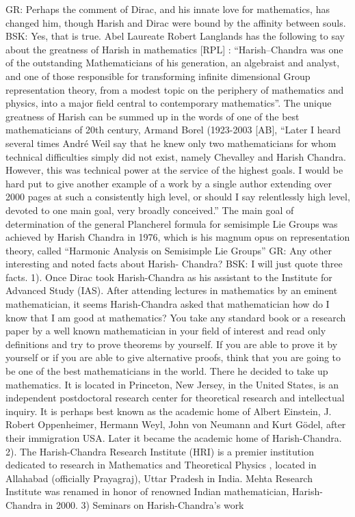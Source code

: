   GR: Perhaps the comment of Dirac, and his innate love for mathematics, has changed him, though Harish and Dirac were bound by the affinity between souls.                                                           BSK: Yes, that is true.  Abel Laureate Robert Langlands has the following to say about the greatness of Harish in mathematics [RPL] : “Harish–Chandra was one of the outstanding Mathematicians of his generation, an algebraist and analyst, and one of those responsible for transforming infinite dimensional Group representation theory, from a modest topic on the periphery of mathematics and physics, into a major field central to contemporary mathematics”. The unique greatness of Harish can be summed up in the words of one of the best mathematicians of 20th century, Armand Borel (1923-2003 [AB], “Later I heard several times André Weil say that he knew only two mathematicians for whom technical difficulties simply did not exist, namely Chevalley and Harish Chandra.  However, this was technical power at the service of the highest goals. I would be hard put to give another example of a work by a single author extending over 2000 pages at such a consistently high level, or should I say relentlessly high level, devoted to one main goal, very broadly conceived.”  The main goal of determination of the general Plancherel formula for semisimple Lie Groups was achieved by Harish Chandra in 1976, which is his magnum opus on representation theory, called “Harmonic Analysis on Semisimple Lie Groups”
GR: Any other interesting and noted facts about Harish- Chandra?
BSK:  I will just quote three facts.
     1). Once Dirac took Harish-Chandra as his assistant to  the Institute for Advanced Study (IAS). After attending  lectures in mathematics by an eminent mathematician,  it seems Harish-Chandra asked that mathematician how do I know that I am good at mathematics? You take any standard book or a research paper by a well known mathematician in your field of interest and read only definitions and try to prove theorems by yourself. If you are able to prove it by yourself or if you are able to give alternative proofs, think that you are going to be one of the best mathematicians in the world. There he decided to take up mathematics.
     It is located in Princeton, New Jersey, in the United States, is an independent postdoctoral research center for theoretical research and intellectual inquiry. It is perhaps best known as the academic home of Albert Einstein, J. Robert Oppenheimer, Hermann Weyl, John von Neumann and Kurt Gödel, after their immigration USA. Later it became the academic home of Harish-Chandra.
  2). The Harish-Chandra Research Institute (HRI) is a premier institution dedicated to research in Mathematics and Theoretical Physics , located in Allahabad (officially Prayagraj), Uttar Pradesh in India. Mehta  Research Institute was renamed in honor of renowned Indian mathematician, Harish-Chandra in 2000.
      3) Seminars on Harish-Chandra’s work

